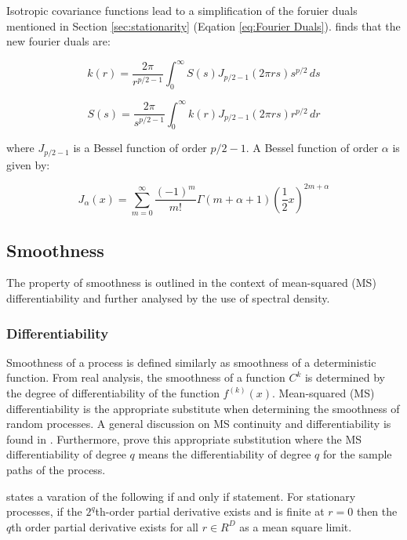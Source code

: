 \documentclass[12pt,a4paper]{article}
\begin{document}
Isotropic covariance functions lead to a  simplification of the foruier duals mentioned in Section \ref{sec:stationarity} (Eqation \eqref{eq:Fourier Duals}). \citet{Bracewell1966TheFT} finds that the new fourier duals are:

\begin{equation}
k(r) = \frac{2\pi}{r^{p/2 - 1}} \int_0^\infty S(s) J_{p/2 - 1}(2\pi rs) s^{p/2} \, ds 
\label{18}
\end{equation}

\begin{equation}
S(s) = \frac{2\pi}{s^{p/2 - 1}} \int_0^\infty k(r) J_{p/2 - 1}(2\pi rs) r^{p/2} \, dr
\label{19}
\end{equation}

where \( J_{p/2 - 1} \) is a Bessel function of order \( p/2 - 1 \). A Bessel function of order \( \alpha \) is given by:

\begin{equation}
J_\alpha(x) = \sum_{m=0}^{\infty} \frac{(-1)^m}{m!} \Gamma\left(m + \alpha + 1 \right) \left( \frac{1}{2} x \right)^{2m + \alpha} 
\label{20}
\end{equation}

\subsection{Smoothness}
\label{sec:Smoothness}
The property of smoothness is outlined in the context of mean-squared (MS) differentiability and further analysed by the use of spectral density.

\subsubsection{Differentiability}

Smoothness of a process is defined similarly as smoothness of a deterministic function. From real analysis, the smoothness of a function \(C^k\) is determined by the degree of differentiability of the function \(f^{(k)}(x)\). Mean-squared (MS) differentiability is the appropriate substitute when determining the smoothness of random processes. A general discussion on MS continuity and differentiability is found in \citet{williams2006gaussian}. Furthermore, \citet{adler2009random} prove this appropriate substitution where the MS differentiability of degree \(q\) means the differentiability of degree \(q\) for the sample paths of the process. 

\citet{Domingo2019Emulation} states a varation of the following if and only if statement. For stationary processes, if the \(2^q\)th-order partial derivative exists and is finite at \(r = 0\) then the \(q\)th order partial derivative exists for all \(r \in R^D\) as a mean square limit.
\end{document}
